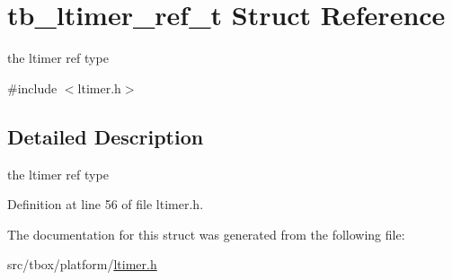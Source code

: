 \hypertarget{structtb__ltimer__ref__t}{\section{tb\-\_\-ltimer\-\_\-ref\-\_\-t Struct Reference}
\label{structtb__ltimer__ref__t}
}


the ltimer ref type  




{\ttfamily \#include $<$ltimer.\-h$>$}



\subsection{Detailed Description}
the ltimer ref type 

Definition at line 56 of file ltimer.\-h.



The documentation for this struct was generated from the following file\-:\begin{DoxyCompactItemize}
\item 
src/tbox/platform/\hyperlink{ltimer_8h}{ltimer.\-h}\end{DoxyCompactItemize}
